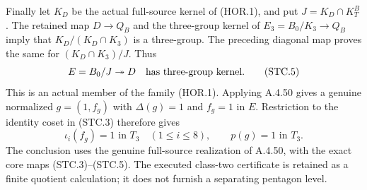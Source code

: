 Finally let $K_D$ be the actual full-source kernel of (HOR.1),
and put $J=K_D\cap K_T^B$.  The retained map $D\to Q_B$ and the
three-group kernel of $E_3=B_0/K_3\to Q_B$ imply that
$K_D/(K_D\cap K_3)$ is a three-group.  The preceding diagonal
map proves the same for $(K_D\cap K_3)/J$.  Thus
\[
 E=B_0/J\twoheadrightarrow D
       \quad\hbox{has three-group kernel}.
 \tag{STC.5}
\]
This is an actual member of the family (HOR.1).  Applying A.4.50
gives a genuine normalized $g=(1,f_g)$ with $\Delta(g)=1$ and
$f_g=1$ in $E$.  Restriction to the identity coset in (STC.3)
therefore gives
\[
 \iota_i(f_g)=1\text{ in }T_3\quad(1\leq i\leq8),
                  \qquad p(g)=1\text{ in }T_3.
 \tag{STC.6}
\]
The conclusion uses the genuine full-source realization of
A.4.50, with the exact core maps (STC.3)--(STC.5).  The executed
class-two certificate is retained as a finite quotient
calculation; it does not furnish a separating pentagon level.
